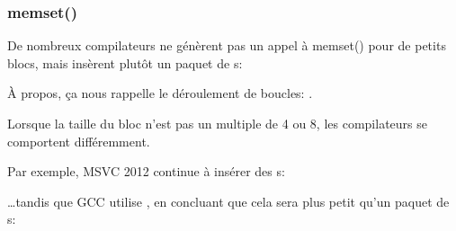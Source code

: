 ﻿\subsubsection{memset()}




De nombreux compilateurs ne génèrent pas un appel à memset() pour de petits blocs,
mais insèrent plutôt un paquet de \MOV{}s:



À propos, ça nous rappelle le déroulement de boucles:
.




Lorsque la taille du bloc n'est pas un multiple de 4 ou 8, les compilateurs se comportent
différemment.

Par exemple, MSVC 2012 continue à insérer des s:



\dots tandis que GCC utilise , en concluant que cela sera plus petit
qu'un paquet de s:


